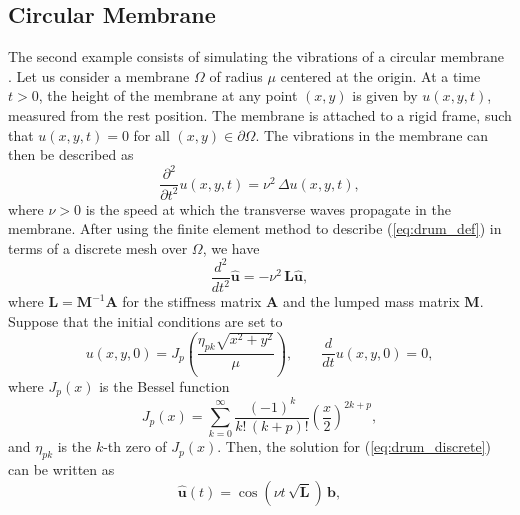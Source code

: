 \documentclass[smallextended]{svjour3}
\renewcommand{\vec}[1]{\mathbf{#1}}
\newcommand{\mat}[1]{\mathbf{#1}}
\begin{document}
\subsection{Circular Membrane}
\label{subsec:wave}

The second example consists of simulating the vibrations of a circular membrane \cite[Chapter 9]{strutt_theory_2011}. Let us consider a membrane $\Omega$ of radius $\mu$ centered at the origin. At a time $t > 0$, the height of the membrane at any point $(x, y)$ is given by $u(x, y, t)$, measured from the rest position. The membrane is attached to a rigid frame, such that $u(x, y, t) = 0$ for all $(x, y) \in \partial \Omega$. The vibrations in the membrane can then be described as
\begin{equation}
\label{eq:drum_def}
\frac{\partial^2}{\partial t^2} u(x, y, t) = \nu^2 \, \Delta u(x, y, t),
\end{equation}
where $\nu > 0$ is the speed at which the transverse waves propagate in the membrane.
After using the finite element method \cite{zienkiewicz_finite_2013} to describe (\ref{eq:drum_def}) in terms of a discrete mesh over $\Omega$, we have
\begin{equation}
\label{eq:drum_discrete}
\frac{d^2}{d t^2} \vec{\hat{u}} = -\nu^2 \,\mat{L} \vec{\hat{u}},
\end{equation}
where $\mat{L} = \mat{M}^{-1} \mat{A}$ for the stiffness matrix $\mat{A}$ and the lumped mass matrix $\mat{M}$. Suppose that the initial conditions are set to
\begin{equation}
\label{eq:drum_initial}
u(x, y, 0) = J_p \left (\frac{\eta_{pk} \sqrt{x^2 + y^2}}{\mu} \right), \qquad \frac{d}{dt}u(x, y, 0) = 0,
\end{equation}
where $J_p (x)$ is the Bessel function
\begin{equation*}
J_p(x) = \sum_{k = 0}^\infty{\frac{(-1)^k}{k! \, (k + p)!} \left(\frac{x}{2} \right)^{2k + p}},
\end{equation*}
and $\eta_{pk}$ is the $k$-th zero of $J_p (x)$. Then, the solution for (\ref{eq:drum_discrete}) can be written as
\begin{equation}
\label{eq:drum_sol}
\vec{\hat{u}}(t) = \cos(\nu t \, \sqrt{\mat{L}}) \, \vec{b},
\end{equation}
\end{document}
